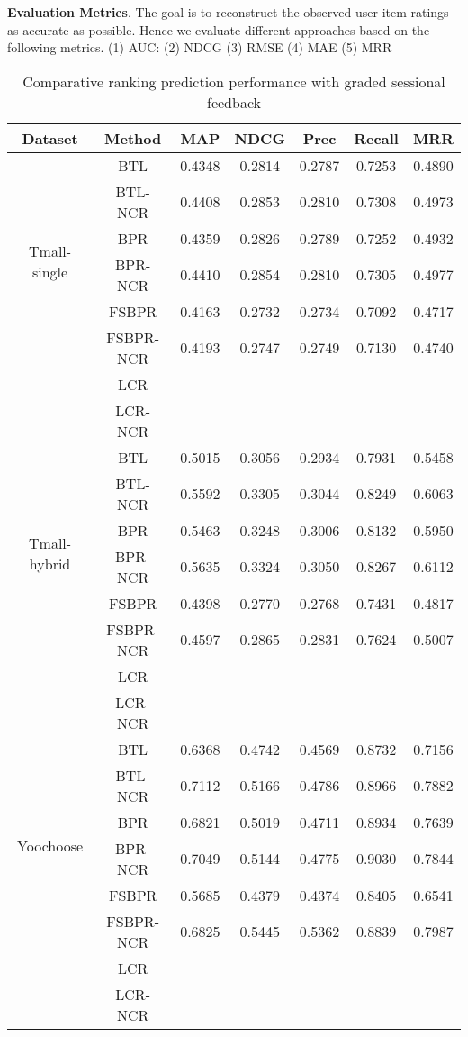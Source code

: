 \documentclass[letterpaper]{article} %
\begin{document}
\textbf{Evaluation Metrics}.  The goal is to reconstruct the observed user-item ratings as accurate as possible. Hence we evaluate different approaches based on the following metrics. (1) AUC: (2) NDCG (3) RMSE (4) MAE (5) MRR

\begin{table}[htp]
\tiny
\caption{Comparative ranking prediction performance with graded sessional feedback}
\begin{center}
\begin{tabular}{|c|c|c|c|c|c|c|}
\hline
Dataset & Method & MAP & NDCG & Prec & Recall & MRR \\\hline
\multirow{6}{*}{Tmall-single} & BTL &0.4348 &0.2814 &0.2787 &0.7253 &0.4890 \\\cline{2-7}
 & BTL-NCR &0.4408 &0.2853 &0.2810 &0.7308 &0.4973 \\\cline{2-7}
 & BPR &0.4359 &0.2826 &0.2789 &0.7252 &0.4932 \\\cline{2-7}
 & BPR-NCR &0.4410 &0.2854 &0.2810 &0.7305 &0.4977 \\\cline{2-7}
 & FSBPR &0.4163 &0.2732 &0.2734 &0.7092 &0.4717 \\\cline{2-7}
  & FSBPR-NCR &0.4193 &0.2747 &0.2749 &0.7130 &0.4740 \\\cline{2-7}
   & LCR & & & & & \\\cline{2-7}
 & LCR-NCR & & & & & \\\hline
\multirow{6}{*}{Tmall-hybrid} & BTL &0.5015 &0.3056 &0.2934 &0.7931 &0.5458 \\\cline{2-7}
 & BTL-NCR &0.5592 &0.3305 &0.3044 &0.8249 &0.6063 \\\cline{2-7}
 & BPR &0.5463 &0.3248 &0.3006 &0.8132 &0.5950 \\\cline{2-7}
 & BPR-NCR &0.5635 &0.3324 &0.3050 &0.8267 &0.6112 \\\cline{2-7}
 & FSBPR &0.4398 &0.2770 &0.2768 &0.7431 &0.4817 \\\cline{2-7}
  & FSBPR-NCR &0.4597 &0.2865 &0.2831 &0.7624 &0.5007 \\\cline{2-7}
   & LCR & & & & & \\\cline{2-7}
 & LCR-NCR & & & & & \\\hline
\multirow{6}{*}{Yoochoose} & BTL &0.6368 &0.4742 &0.4569 &0.8732 &0.7156 \\\cline{2-7}
 & BTL-NCR &0.7112 &0.5166 &0.4786 &0.8966 &0.7882 \\\cline{2-7}
 & BPR &0.6821 &0.5019 &0.4711 &0.8934 &0.7639 \\\cline{2-7}
 & BPR-NCR &0.7049 &0.5144 &0.4775 &0.9030 &0.7844 \\\cline{2-7}
 & FSBPR &0.5685 &0.4379 &0.4374 &0.8405 &0.6541\\\cline{2-7}
  & FSBPR-NCR &0.6825 &0.5445 &0.5362 &0.8839 &0.7987  \\\cline{2-7}
   & LCR & & & & & \\\cline{2-7}
 & LCR-NCR & & & & & \\\hline
\end{tabular}
\end{center}
\label{tab:ratingresult}
\end{table}%
\end{document}
